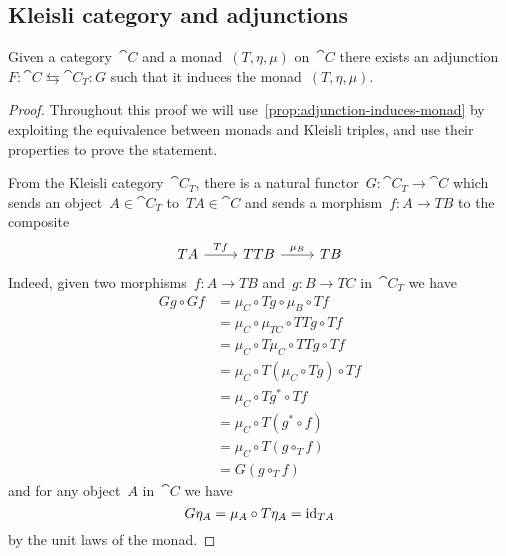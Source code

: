 \documentclass[../TFG.tex]{subfiles}
\begin{document}
\subsection{Kleisli category and adjunctions}
\begin{theorem}
    Given a category~\(\cat{C}\) and a monad~\((T,\eta,\mu)\) on~\(\cat{C}\)
    there exists an adjunction~\(F:\cat{C}\leftrightarrows\cat{C}_{T}:G\)
    such that it induces the monad~\((T,\eta,\mu)\).
\end{theorem}
\begin{proof}
    Throughout this proof we will use~\ref{prop:adjunction-induces-monad} by
    exploiting the equivalence between monads and Kleisli triples, and use their
    properties to prove the statement.

    From the Kleisli category~\(\cat{C}_{T}\), there is a natural
    functor~\(G:\cat{C}_{T}\longrightarrow\cat{C}\) which sends an
    object~\(A\in\cat{C}_{T}\) to~\(TA\in\cat{C}\) and sends a
    morphism~\(f:A\longrightarrow TB\) to the composite
    \[\begin{tikzcd}
        TA \ar[r, "Tf"] & TTB \ar[r, "\mu_{B}"] & TB
    \end{tikzcd}\]
    Indeed, given two morphisms~\(f:A\longrightarrow TB\)
    and~\(g:B\longrightarrow TC\) in~\(\cat{C}_{T}\) we have
    \begin{align*}
        Gg \circ Gf
            &= \mu_{C} \circ Tg \circ \mu_{B} \circ Tf \\
            &= \mu_{C} \circ \mu_{TC} \circ TTg \circ Tf \\
            &= \mu_{C} \circ T\mu_{C} \circ TTg \circ Tf \\
            &= \mu_{C} \circ T(\mu_{C} \circ Tg) \circ Tf \\
            &= \mu_{C} \circ Tg^{\ast} \circ Tf \\
            &= \mu_{C} \circ T(g^{\ast} \circ f) \\
            &= \mu_{C} \circ T(g \circ_{T} f) \\
            &= G(g\circ_{T} f) 
    \end{align*}
    and for any object~\(A\) in~\(\cat{C}\) we have
    \[
        G\eta_{A} = \mu_{A} \circ T\eta_{A} = \mathrm{id}_{TA}
    \]
    by the unit laws of the monad.


\end{proof}
\end{document}
